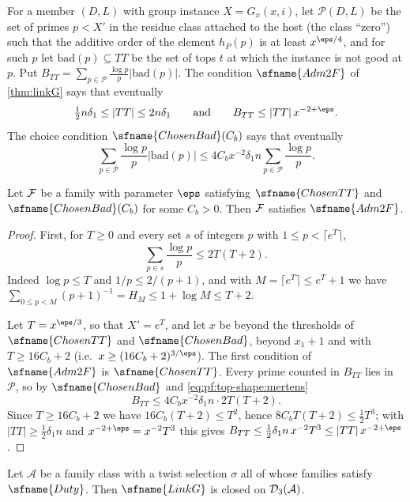 For a member $(D,L)$ with group instance $X=G_x(x,i)$, let $\mathcal P(D,L)$ be the set of primes $p<X'$ in the
residue class attached to the host (the class ``zero'') such that the additive order of the element $h_P(p)$ is
at least $x^{\eps/4}$, and for such $p$ let $\mathrm{bad}(p)\subseteq TT$ be the set of tops $t$ at which the
instance is not good at $p$. Put $B_{TT}=\sum_{p\in\mathcal P}\frac{\log p}p|\mathrm{bad}(p)|$. The condition
$\sfname{Adm2F}$ of \cref{thm:linkG} says that eventually
\[
\tfrac12n\delta_1\le|TT|\le2n\delta_1\qquad\text{and}\qquad B_{TT}\le|TT|\,x^{-2+\eps}.
\]
The choice condition $\sfname{ChosenBad}(C_b)$ says that eventually
\[
\sum_{p\in\mathcal P}\frac{\log p}p|\mathrm{bad}(p)|\le4C_bx^{-2}\delta_1n\sum_{p\in\mathcal P}\frac{\log p}p .
\]

\begin{lemma}\label{pf:top-shape:mertens}
Let $\mathcal{F}$ be a family with parameter $\eps$ satisfying $\sfname{ChosenTT}$ and $\sfname{ChosenBad}(C_b)$ for
some $C_b>0$. Then $\mathcal{F}$ satisfies $\sfname{Adm2F}$.
\end{lemma}

\begin{proof}
First, for $T\ge0$ and every set $s$ of integers $p$ with $1\le p<\lceil e^T\rceil$,
\begin{equation}\label{eq:pf:top-shape:mertens}
\sum_{p\in s}\frac{\log p}p\le2T(T+2).
\end{equation}
Indeed $\log p\le T$ and $1/p\le2/(p+1)$, and with $M=\lceil e^T\rceil\le e^T+1$ we have
$\sum_{0\le p<M}(p+1)^{-1}=H_M\le1+\log M\le T+2$.

Let $T=x^{\eps/3}$, so that $X'=e^T$, and let $x$ be beyond the thresholds of $\sfname{ChosenTT}$ and
$\sfname{ChosenBad}$, beyond $x_1+1$ and with $T\ge16C_b+2$ (i.e.\ $x\ge(16C_b+2)^{3/\eps}$). The first condition of
$\sfname{Adm2F}$ is $\sfname{ChosenTT}$. Every prime counted in $B_{TT}$ lies in $\mathcal P$, so by
$\sfname{ChosenBad}$ and \eqref{eq:pf:top-shape:mertens}
\[
B_{TT}\le4C_bx^{-2}\delta_1n\cdot2T(T+2).
\]
Since $T\ge16C_b+2$ we have $16C_b(T+2)\le T^2$, hence $8C_bT(T+2)\le\frac12T^3$; with $|TT|\ge\frac12\delta_1n$
and $x^{-2+\eps}=x^{-2}T^3$ this gives $B_{TT}\le\frac12\delta_1n\,x^{-2}T^3\le|TT|\,x^{-2+\eps}$.
\end{proof}

\begin{proposition}\label{pf:top-shape:linkG}
Let $\mathcal A$ be a family class with a twist selection $\sigma$ all of whose families satisfy $\sfname{Duty}$.
Then $\sfname{LinkG}$ is closed on $\mathcal{D}_3(\mathcal A)$.
\end{proposition}

